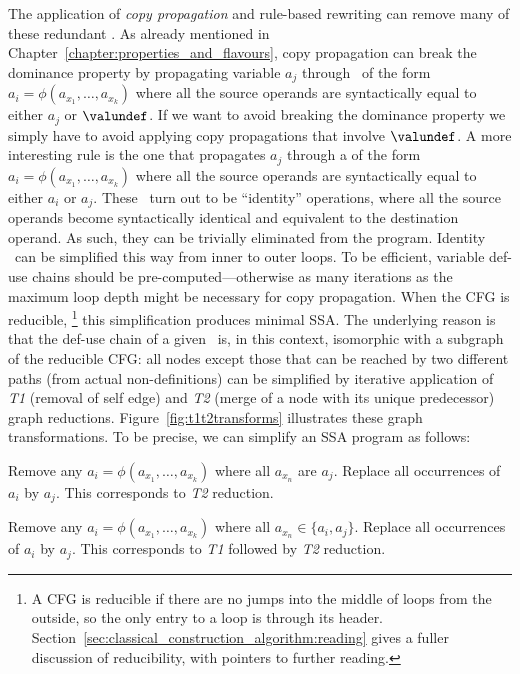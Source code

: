 {The application of \emph{copy propagation} and rule-based \phifun rewriting can remove many of these redundant \phifuns. 
As already mentioned in Chapter~\ref{chapter:properties_and_flavours}, copy propagation can break the dominance property by propagating variable $a_j$ through \phifuns\ of the form $a_i=\phi(a_{x_1},\ldots,a_{x_k})$ where all the source operands are syntactically equal to either $a_j$ or $\valundef$. 
If we want to avoid breaking the dominance property we simply have to avoid applying copy propagations that involve $\valundef$. 
A more interesting rule is the one that propagates $a_j$ through a \phifun of the form $a_i=\phi(a_{x_1},\ldots,a_{x_k})$ where all the source operands are syntactically equal to either $a_i$ or $a_j$. 
These \phifuns\ turn out to be ``identity'' operations, where all the source operands become syntactically identical and equivalent to the destination operand. 
As such, they can be trivially eliminated from the program. 
Identity \phifuns\ can be simplified this way from inner to outer loops. 
To be efficient, variable def-use chains should be pre-computed---otherwise as many iterations as the maximum loop depth might be necessary for copy propagation. 
When the CFG is reducible,
\footnote{A CFG is reducible if there are no jumps into the middle of loops from the outside, so the only entry to a loop is through its header. 
  Section~\ref{sec:classical_construction_algorithm:reading} gives a fuller discussion of reducibility, with pointers to further reading.} 
this simplification produces minimal SSA.
The underlying reason is that the def-use chain of a given \phiweb\ is, in this context, isomorphic with a subgraph of the reducible CFG: 
all nodes except those that can be reached by two different paths (from actual non-\phifun definitions) can be simplified by iterative application of \emph{T1} (removal of self edge) and \emph{T2} (merge of a node with its unique predecessor) graph reductions. 
Figure~\ref{fig:t1t2transforms} illustrates these graph transformations. 
To be precise, we can simplify an SSA program as follows:
\begin{compactenum}
\item Remove any \phinode $a_i=\phi(a_{x_1},\ldots,a_{x_k})$ where all $a_{x_n}$ are $a_j$.
  Replace all occurrences of $a_i$ by $a_j$.
  This corresponds to \emph{T2} reduction.
\item Remove any \phinode $a_i=\phi(a_{x_1},\ldots,a_{x_k})$ where all $a_{x_n} \in \{ a_i, a_j \}$. 
  Replace all occurrences of $a_i$ by $a_j$. 
  This corresponds to \emph{T1} followed by \emph{T2} reduction.
\end{compactenum}

}
